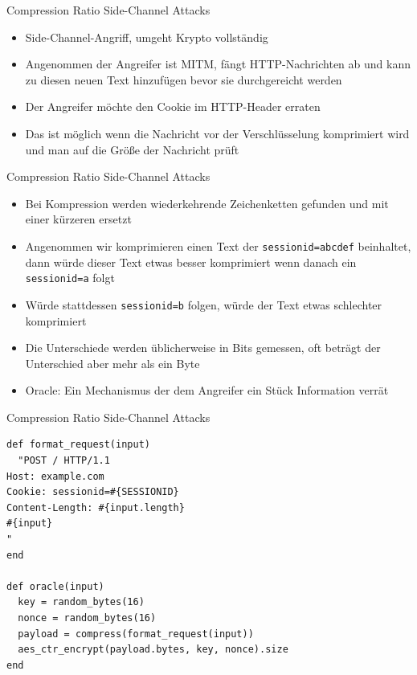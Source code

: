 \documentclass[presentation]{beamer}
\begin{document}
\begin{frame}[label={sec:orge65eeb9}]{Compression Ratio Side-Channel Attacks}
\begin{itemize}
\item Side-Channel-Angriff, umgeht Krypto vollständig
\item Angenommen der Angreifer ist MITM, fängt HTTP-Nachrichten ab und
kann zu diesen neuen Text hinzufügen bevor sie durchgereicht werden
\item Der Angreifer möchte den Cookie im HTTP-Header erraten
\item Das ist möglich wenn die Nachricht vor der Verschlüsselung
komprimiert wird und man auf die Größe der Nachricht prüft
\end{itemize}
\end{frame}

\begin{frame}[fragile,label={sec:org5a61585}]{Compression Ratio Side-Channel Attacks}
 \begin{itemize}
\item Bei Kompression werden wiederkehrende Zeichenketten gefunden und mit
einer kürzeren ersetzt
\item Angenommen wir komprimieren einen Text der \texttt{sessionid=abcdef}
beinhaltet, dann würde dieser Text etwas besser komprimiert wenn
danach ein \texttt{sessionid=a} folgt
\item Würde stattdessen \texttt{sessionid=b} folgen, würde der Text etwas
schlechter komprimiert
\item Die Unterschiede werden üblicherweise in Bits gemessen, oft beträgt
der Unterschied aber mehr als ein Byte
\item Oracle: Ein Mechanismus der dem Angreifer ein Stück Information
verrät
\end{itemize}
\end{frame}

\begin{frame}[fragile,label={sec:org829f8a7}]{Compression Ratio Side-Channel Attacks}
 \begin{verbatim}
def format_request(input)
  "POST / HTTP/1.1
Host: example.com
Cookie: sessionid=#{SESSIONID}
Content-Length: #{input.length}
#{input}
"
end

def oracle(input)
  key = random_bytes(16)
  nonce = random_bytes(16)
  payload = compress(format_request(input))
  aes_ctr_encrypt(payload.bytes, key, nonce).size
end
\end{verbatim}
\end{frame}
\end{document}
